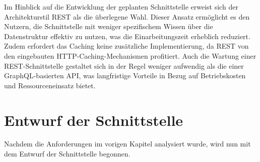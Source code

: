 \documentclass[draft,final]{vutinfth} %
\begin{document}
Im Hinblick auf die Entwicklung der geplanten Schnittstelle erweist sich der Architekturstil REST als die überlegene Wahl. 
Dieser Ansatz ermöglicht es den Nutzern, die Schnittstelle mit weniger spezifischem Wissen über die Datenstruktur effektiv zu nutzen, was die Einarbeitungszeit erheblich reduziert. 
Zudem erfordert das Caching keine zusätzliche Implementierung, da REST von den eingebauten HTTP-Caching-Mechanismen profitiert. 
Auch die Wartung einer REST-Schnittstelle gestaltet sich in der Regel weniger aufwendig als die einer GraphQL-basierten API, was langfristige Vorteile in Bezug auf Betriebskosten und Ressourceneinsatz bietet.






%	
%	









\chapter{Entwurf der Schnittstelle}

Nachdem die Anforderungen im vorigen Kapitel analysiert wurde, wird nun mit dem Entwurf der Schnittstelle begonnen.
\end{document}

